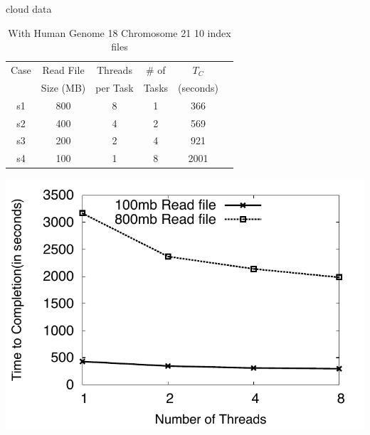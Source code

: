 \documentclass{article}
\begin{document}
cloud data
 \begin{table}
 \small
 \begin{tabular}{|c|c|c|c|c|c|} 
 \hline 
Case & Read File  & Threads & \# of   & $T_C$ \\
& Size  (MB)&  per Task&  Tasks &  (seconds)  \\  \hline
s1 & 800 &  8 & 1 &366  \\
s2 & 400  & 4 & 2 &569  \\
s3 & 200 & 2 & 4 & 921  \\ 
s4& 100 & 1 & 8& 2001 \\
 \hline
 \end{tabular}
 \caption{With  Human Genome 18 Chromosome 21 10 index files   }
\end{table}

\includegraphics[scale=0.66]{../figures/cloud_threadsvstime.pdf} 
\end{document}

